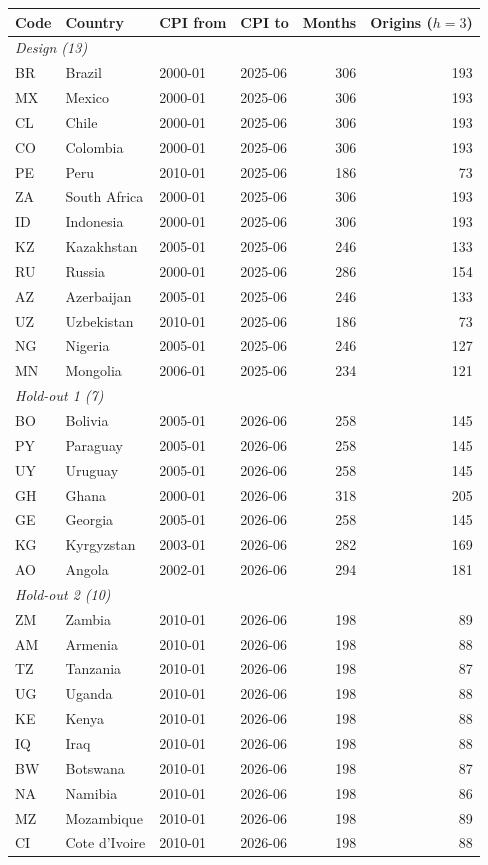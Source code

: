 \begin{tabular}{llllrr}
\toprule
Code & Country & CPI from & CPI to & Months & Origins ($h{=}3$) \\
\midrule
\multicolumn{6}{l}{\emph{Design (13)}} \\
BR & Brazil & 2000-01 & 2025-06 & 306 & 193 \\
MX & Mexico & 2000-01 & 2025-06 & 306 & 193 \\
CL & Chile & 2000-01 & 2025-06 & 306 & 193 \\
CO & Colombia & 2000-01 & 2025-06 & 306 & 193 \\
PE & Peru & 2010-01 & 2025-06 & 186 & 73 \\
ZA & South Africa & 2000-01 & 2025-06 & 306 & 193 \\
ID & Indonesia & 2000-01 & 2025-06 & 306 & 193 \\
KZ & Kazakhstan & 2005-01 & 2025-06 & 246 & 133 \\
RU & Russia & 2000-01 & 2025-06 & 286 & 154 \\
AZ & Azerbaijan & 2005-01 & 2025-06 & 246 & 133 \\
UZ & Uzbekistan & 2010-01 & 2025-06 & 186 & 73 \\
NG & Nigeria & 2005-01 & 2025-06 & 246 & 127 \\
MN & Mongolia & 2006-01 & 2025-06 & 234 & 121 \\
\midrule
\multicolumn{6}{l}{\emph{Hold-out 1 (7)}} \\
BO & Bolivia & 2005-01 & 2026-06 & 258 & 145 \\
PY & Paraguay & 2005-01 & 2026-06 & 258 & 145 \\
UY & Uruguay & 2005-01 & 2026-06 & 258 & 145 \\
GH & Ghana & 2000-01 & 2026-06 & 318 & 205 \\
GE & Georgia & 2005-01 & 2026-06 & 258 & 145 \\
KG & Kyrgyzstan & 2003-01 & 2026-06 & 282 & 169 \\
AO & Angola & 2002-01 & 2026-06 & 294 & 181 \\
\midrule
\multicolumn{6}{l}{\emph{Hold-out 2 (10)}} \\
ZM & Zambia & 2010-01 & 2026-06 & 198 & 89 \\
AM & Armenia & 2010-01 & 2026-06 & 198 & 88 \\
TZ & Tanzania & 2010-01 & 2026-06 & 198 & 87 \\
UG & Uganda & 2010-01 & 2026-06 & 198 & 88 \\
KE & Kenya & 2010-01 & 2026-06 & 198 & 88 \\
IQ & Iraq & 2010-01 & 2026-06 & 198 & 88 \\
BW & Botswana & 2010-01 & 2026-06 & 198 & 87 \\
NA & Namibia & 2010-01 & 2026-06 & 198 & 86 \\
MZ & Mozambique & 2010-01 & 2026-06 & 198 & 89 \\
CI & Cote d'Ivoire & 2010-01 & 2026-06 & 198 & 88 \\
\bottomrule
\end{tabular}
